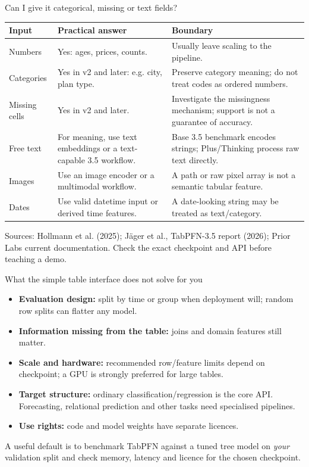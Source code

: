 \documentclass[aspectratio=169]{beamer}
\begin{document}
\begin{frame}{Can I give it categorical, missing or text fields?}
  \footnotesize
  \begin{tabular}{>{\raggedright\arraybackslash}p{2.0cm}>{\raggedright\arraybackslash}p{4.45cm}>{\raggedright\arraybackslash}p{4.8cm}}
    \toprule
    \textbf{Input} & \textbf{Practical answer} & \textbf{Boundary} \\
    \midrule
    Numbers & Yes: ages, prices, counts. & Usually leave scaling to the pipeline. \\
    Categories & Yes in v2 and later: e.g. city, plan type. & Preserve category meaning; do not treat codes as ordered numbers. \\
    Missing cells & Yes in v2 and later. & Investigate the missingness mechanism; support is not a guarantee of accuracy. \\
    Free text & For meaning, use text embeddings or a text-capable 3.5 workflow. & Base 3.5 benchmark encodes strings; Plus/Thinking process raw text directly. \\
    Images & Use an image encoder or a multimodal workflow. & A path or raw pixel array is not a semantic tabular feature. \\
    Dates & Use valid datetime input or derived time features. & A date-looking string may be treated as text/category. \\
    \bottomrule
  \end{tabular}
  \vskip 5pt
  \scriptsize
  Sources: Hollmann et al. (2025); J\"ager et al., TabPFN-3.5 report (2026);
  Prior Labs current documentation. Check the exact checkpoint and API before teaching a demo.
\end{frame}

\begin{frame}{What the simple table interface does not solve for you}
  \small
  \begin{itemize}\itemsep 6pt
    \item \textbf{Evaluation design:} split by time or group when deployment will; random row
      splits can flatter any model.
    \item \textbf{Information missing from the table:} joins and domain features still matter.
    \item \textbf{Scale and hardware:} recommended row/feature limits depend on checkpoint;
      a GPU is strongly preferred for large tables.
    \item \textbf{Target structure:} ordinary classification/regression is the core API.
      Forecasting, relational prediction and other tasks need specialised pipelines.
    \item \textbf{Use rights:} code and model weights have separate licences.
  \end{itemize}
  \vskip 4pt
  \footnotesize
  A useful default is to benchmark TabPFN against a tuned tree model on \emph{your}
  validation split and check memory, latency and licence for the chosen checkpoint.
\end{frame}
\end{document}
